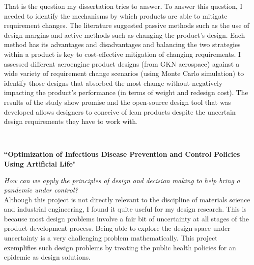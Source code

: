 \documentclass[12pt]{article} %
\begin{document}
{	That is the question my dissertation tries to answer. To answer this question, I needed to identify the mechanisms by which products are able to mitigate requirement changes. The literature suggested passive methods such as the use of design margins and active methods such as changing the product's design. Each method has its advantages and disadvantages and balancing the two strategies within a product is key to cost-effective mitigation of changing requirements. I assessed different aeroengine product designs (from GKN aerospace) against a wide variety of requirement change scenarios (using Monte Carlo simulation) to identify those designs that absorbed the most change without negatively impacting the product's performance (in terms of weight and redesign cost). The results of the study show promise and the open-source design tool that was developed allows designers to conceive of lean products despite the uncertain design requirements they have to work with.

	~
	~
	~
	~
	~
	~
	~
	~
	~


	\medskip %

	{\raggedright\textbf{``Optimization of Infectious Disease Prevention and Control Policies Using Artificial Life"}}
	\textit{\center How can we apply the principles of design and decision making to help bring a pandemic under control?}\\

	Although this project is not directly relevant to the discipline of materials science and industrial engineering, I found it quite useful for my design research. This is because most design problems involve a fair bit of uncertainty at all stages of the product development process. Being able to explore the design space under uncertainty is a very challenging problem mathematically. This project exemplifies such design problems by treating the public health policies for an epidemic as design solutions. 

}
\end{document}
